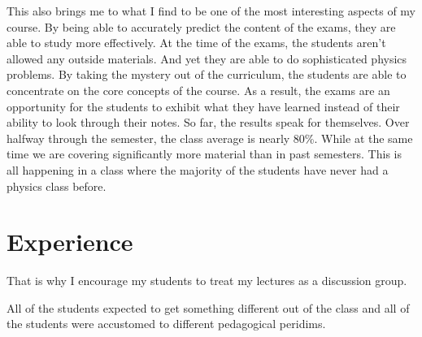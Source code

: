 {This also brings me to what I find to be one of the most interesting aspects of my course.  By being able to accurately predict the content of the exams, they are able to study more effectively.
At the time of the exams, the students aren't allowed any outside materials.  And yet they are able to do sophisticated physics problems.  By taking the mystery out of the curriculum, the students are able to concentrate on the core concepts of the course.  As a result, the exams are an opportunity for the students to exhibit what they have learned instead of their ability to look through their notes.
So far, the results speak for themselves.  Over halfway through the semester, the class average is nearly 80\%.  While at the same time we are covering significantly more material than in past semesters.  This is all happening in a class where the majority of the students have never had a physics class before.%




\def\secname{Experience}
\section*{\secname}
\addcontentsline{toc}{section}{\secname}%



That is why I encourage my students to treat my lectures as a discussion group.


All of the students expected to get something different out of the class and all of the students were accustomed to different pedagogical peridims.
}